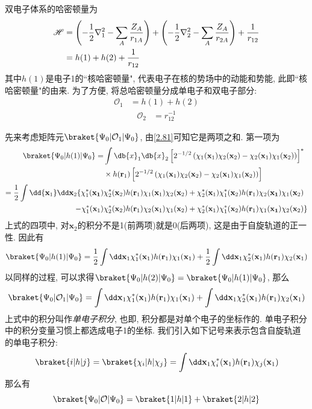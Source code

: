 双电子体系的哈密顿量为
\begin{align}
\mathscr{H}&=\left( -\frac{1}{2}\nabla_1^2 - \sum_A\frac{Z_A}{r_{1A}} \right) + \left( -\frac{1}{2}\nabla_2^2 - \sum_A\frac{Z_A}{r_{2A}} \right) + \frac{1}{r_{12}}\notag\\
&=h(1) + h(2) + \frac{1}{r_{12}}
\end{align}
其中$h(1)$是电子1的``核哈密顿量", 
代表电子在核的势场中的动能和势能, 
此即``核哈密顿量"的由来. 
为了方便, 
将总哈密顿量分成单电子和双电子部分:
\begin{align}
\mathcal{O}_1&=h(1)+h(2)
\label{2.81}
\end{align}
\begin{align}
\mathcal{O}_2&=r_{12}^{-1}
\end{align}

先来考虑矩阵元$\braket{\Psi_0|\mathcal{O}_1|\Psi_0}$, 
由\autoref{2.81}可知它是两项之和. 
第一项为
\begin{align}
\braket{\Psi_0|h(1)|\Psi_0}=&\int\db{x}_1\db{x}_2\left[2^{-1/2}\left(\chi_1(\mathbf{x}_1)\chi_2(\mathbf{x}_2)-\chi_2(\mathbf{x}_1)\chi_1(\mathbf{x}_2)\right)\right]^*\notag\\
\qquad&\times h(\mathbf{r}_1)\left[ 2^{-1/2}\left(\chi_1(\mathbf{x}_1)\chi_2(\mathbf{x}_2)-\chi_2(\mathbf{x}_1)\chi_1(\mathbf{x}_2)\right)\right]\notag\\
=\frac{1}{2}\int\dd{\mathbf{x}_1}\dd\mathbf{x}_2\{\chi_1^*(\mathbf{x_1})&\chi_2^*(\mathbf{x}_2)h(\mathbf{r}_1)\chi_1(\mathbf{x}_1)\chi_2(\mathbf{x}_2) + \chi_2^*(\mathbf{x}_1)\chi_1^*(\mathbf{x}_2)h(\mathbf{r}_1)\chi_2(\mathbf{x_1})\chi_1(\mathbf{x}_2) \notag\\
 - \chi_1^*(\mathbf{x}_1)&\chi_2^*(\mathbf{x}_2)h(\mathbf{r}_1)\chi_2(\mathbf{x}_1)\chi_1(\mathbf{x}_2) + \chi_2^*(\mathbf{x}_1)\chi_1^*(\mathbf{x}_2)h(\mathbf{r}_1)\chi_1(\mathbf{x_1})\chi_2(\mathbf{x}_2)
\}
\end{align}
上式的四项中, 
对$\mathbf{x}_2$的积分不是1(前两项)就是0(后两项), 
这是由于自旋轨道的正一性. 
因此有
\begin{equation}
\braket{\Psi_0|h(1)|\Psi_0}=\frac{1}{2}\int\dd\mathbf{x}_1\chi_1^*(\mathbf{x}_1)h(\mathbf{r}_1)\chi_1(\mathbf{x}_1)+\frac{1}{2}\int\dd\mathbf{x}_1\chi_2^*(\mathbf{x}_1)h(\mathbf{r}_1)\chi_2(\mathbf{x}_1)
\end{equation}
以同样的过程, 
可以求得$\braket{\Psi_0|h(2)|\Psi_0}=\braket{\Psi_0|h(1)|\Psi_0}$, 
那么
\begin{equation}
\braket{\Psi_0|\mathcal{O}_1|\Psi_0}=\int\dd\mathbf{x}_1\chi_1^*(\mathbf{x}_1)h(\mathbf{r}_1)\chi_1(\mathbf{x}_1) + \int\dd\mathbf{x}_1\chi_2^*(\mathbf{x}_1)h(\mathbf{r}_1)\chi_2(\mathbf{x}_1)
\end{equation}
上式中的积分叫作\emph{单电子积分}, 
也即, 
积分都是对单个电子的坐标作的. 
单电子积分中的积分变量习惯上都选成电子1的坐标. 
我们引入如下记号来表示包含自旋轨道的单电子积分:
\begin{equation}
\braket{i|h|j}=\braket{\chi_i|h|\chi_j}=\int\dd\mathbf{x}_1\chi_i^*(\mathbf{x}_1)h(\mathbf{r}_1)\chi_j(\mathbf{x}_1)
\end{equation}
那么有
\begin{equation}
\braket{\Psi_0|\mathcal{O}|\Psi_0}=\braket{1|h|1}+\braket{2|h|2}
\end{equation}

